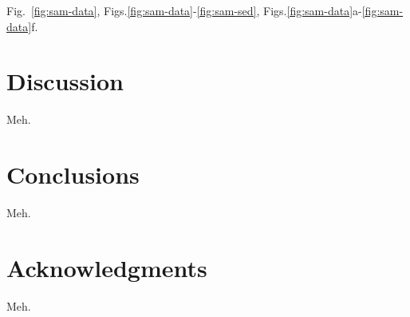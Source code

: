 \documentclass[extra]{gji}
\newcommand{\fig}[1]{Fig.~\ref{fig:#1}}
\newcommand{\figs}[2]{Figs.\ref{fig:#1}-\ref{fig:#2}}
\newcommand{\subfigs}[3]{Figs.\ref{fig:#1}#2-\ref{fig:#1}#3}
\begin{document}
\fig{sam-data}, \figs{sam-data}{sam-sed}, \subfigs{sam-data}{a}{f}.

\section{Discussion}

Meh.

\section{Conclusions}

Meh.

\section{Acknowledgments}

Meh.



\end{document}
